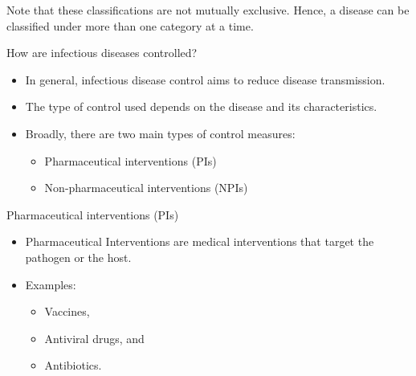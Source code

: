 \documentclass[
  ignorenonframetext,
]{beamer}
\providecommand{\tightlist}{%
  \setlength{\itemsep}{0pt}\setlength{\parskip}{0pt}}\usepackage{longtable,booktabs,array}
\begin{document}
\begin{frame}
Note that these classifications are not mutually exclusive. Hence, a
disease can be classified under more than one category at a time.
\end{frame}

\begin{frame}
\begin{block}{How are infectious diseases controlled?}
\label{sec-control-measures}
\begin{itemize}
\tightlist
\item
  In general, infectious disease control aims to reduce disease
  transmission.
\item
  The type of control used depends on the disease and its
  characteristics.
\item
  Broadly, there are two main types of control measures:

  \begin{itemize}
  \tightlist
  \item
    Pharmaceutical interventions (PIs)
  \item
    Non-pharmaceutical interventions (NPIs)
  \end{itemize}
\end{itemize}
\end{block}
\end{frame}

\begin{frame}
\begin{block}{Pharmaceutical interventions (PIs)}
\label{pharmaceutical-interventions-pis}
\begin{itemize}
\item
  Pharmaceutical Interventions are medical interventions that target the
  pathogen or the host.
\item
  Examples:

  \begin{itemize}
  \tightlist
  \item
    Vaccines,
  \item
    Antiviral drugs, and
  \item
    Antibiotics.
  \end{itemize}
\end{itemize}
\end{block}
\end{frame}
\end{document}
